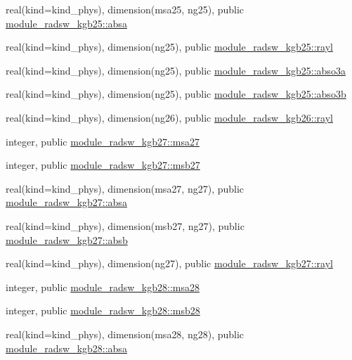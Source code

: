 \begin{DoxyCompactItemize}
\item 
real(kind=kind\+\_\+phys), dimension(msa25, ng25), public \hyperlink{namespacemodule__radsw__kgb25_af4daf474954d4689219ada6d0662aceb}{module\+\_\+radsw\+\_\+kgb25\+::absa}
\item 
real(kind=kind\+\_\+phys), dimension(ng25), public \hyperlink{namespacemodule__radsw__kgb25_a3d32a0d74d03129cacd9c4bb2e58683a}{module\+\_\+radsw\+\_\+kgb25\+::rayl}
\item 
real(kind=kind\+\_\+phys), dimension(ng25), public \hyperlink{namespacemodule__radsw__kgb25_ab02765dac8ca71a439cdaf1ed2691851}{module\+\_\+radsw\+\_\+kgb25\+::abso3a}
\item 
real(kind=kind\+\_\+phys), dimension(ng25), public \hyperlink{namespacemodule__radsw__kgb25_a2844cade392c8805b1d418bc1260b3a5}{module\+\_\+radsw\+\_\+kgb25\+::abso3b}
\item 
real(kind=kind\+\_\+phys), dimension(ng26), public \hyperlink{namespacemodule__radsw__kgb26_ab090be57484d2c5b67dda3d83c1c542b}{module\+\_\+radsw\+\_\+kgb26\+::rayl}
\item 
integer, public \hyperlink{namespacemodule__radsw__kgb27_abdab838f66aba14b64bce733f797cf26}{module\+\_\+radsw\+\_\+kgb27\+::msa27}
\item 
integer, public \hyperlink{namespacemodule__radsw__kgb27_a3b2e57a0d4596aead5cad5aaca74850d}{module\+\_\+radsw\+\_\+kgb27\+::msb27}
\item 
real(kind=kind\+\_\+phys), dimension(msa27, ng27), public \hyperlink{namespacemodule__radsw__kgb27_a300726e54369a14bfbe6b486f5aab01b}{module\+\_\+radsw\+\_\+kgb27\+::absa}
\item 
real(kind=kind\+\_\+phys), dimension(msb27, ng27), public \hyperlink{namespacemodule__radsw__kgb27_a8edb349c908e6950e0d18f293dd1b6ea}{module\+\_\+radsw\+\_\+kgb27\+::absb}
\item 
real(kind=kind\+\_\+phys), dimension(ng27), public \hyperlink{namespacemodule__radsw__kgb27_aca4c6e06d1cd46568048a035c6726f1d}{module\+\_\+radsw\+\_\+kgb27\+::rayl}
\item 
integer, public \hyperlink{namespacemodule__radsw__kgb28_a32c6693eb82a3ed47ed13e07f526471a}{module\+\_\+radsw\+\_\+kgb28\+::msa28}
\item 
integer, public \hyperlink{namespacemodule__radsw__kgb28_a55d73e39264b431135c6a9c809e20a94}{module\+\_\+radsw\+\_\+kgb28\+::msb28}
\item 
real(kind=kind\+\_\+phys), dimension(msa28, ng28), public \hyperlink{namespacemodule__radsw__kgb28_a5e48daf035b3b22b6e1b0f36aabcec10}{module\+\_\+radsw\+\_\+kgb28\+::absa}

\end{DoxyCompactItemize}

